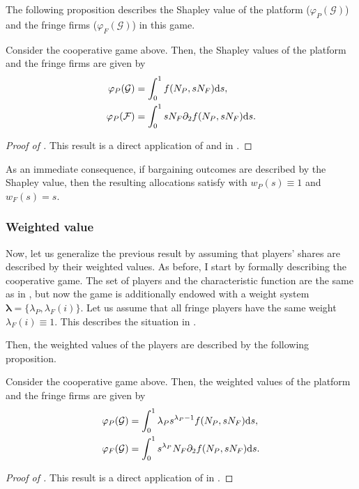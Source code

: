 The following proposition describes the Shapley value of the platform ($\varphi_P(\mathcal{G})$) and the fringe firms ($\varphi_F(\mathcal{G})$) in this game.

\begin{proposition}
    \label{prop:profit_sharing_one_sided}
    Consider the cooperative game above.
    Then, the Shapley values of the platform and the fringe firms are given by
    \begin{align*}
        \varphi_P(\mathcal{G}) &= \int_0^1 f(N_P, s N_F) \mathrm{d}s, \\
        \varphi_P(\mathcal{F}) &= \int_0^1 s N_F \partial_2 f(N_P, s N_F) \mathrm{d}s.
    \end{align*}
\end{proposition}
\begin{proof}[Proof of ]
    This result is a direct application of \propshapley{} and \propshapleyfringe{} in \theoryref{}.
\end{proof}

As an immediate consequence, if bargaining outcomes are described by the Shapley value, then the resulting allocations satisfy  with $w_P(s) \equiv 1$ and $w_F(s) = s$.


\subsubsection{Weighted value}
\label{sec:cooperative_game_weighted}

Now, let us generalize the previous result by assuming that players' shares are described by their weighted values.
As before, I start by formally describing the cooperative game.
The set of players and the characteristic function are the same as in , but now the game is additionally endowed with a weight system $\mathbf{\lambda} = \{\lambda_P, \lambda_{F}(i)\}$.
Let us assume that all fringe players have the same weight $\lambda_{F}(i) \equiv 1$.
This describes the situation in .

Then, the weighted values of the players are described by the following proposition.

\begin{proposition}
    \label{prop:profit_sharing_weighted}
    Consider the cooperative game above.
    Then, the weighted values of the platform and the fringe firms are given by
    \begin{align*}
        \varphi_P(\mathcal{G}) &= \int_0^1 \lambda_P s ^ {\lambda_P - 1} f(N_P, s N_F) \mathrm{d}s, \\
        \varphi_F(\mathcal{G}) &= \int_0^1 s ^ {\lambda_P} N_F \partial_2 f(N_P, s N_F) \mathrm{d}s.
    \end{align*}
\end{proposition}
\begin{proof}[Proof of ]
    This result is a direct application of \propweighted{} in \theoryref{}.
\end{proof}

